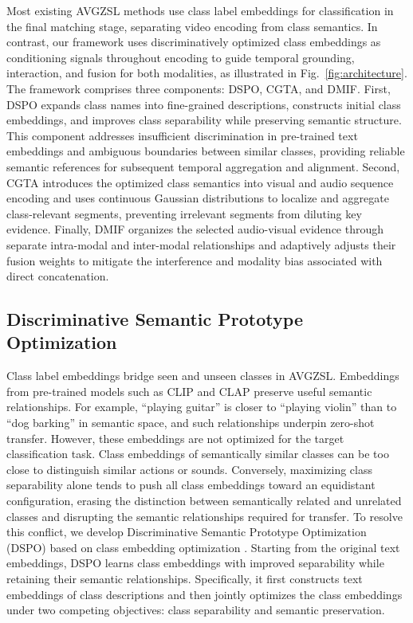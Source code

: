 Most existing AVGZSL methods use class label embeddings for classification in the final matching stage, separating video encoding from class semantics. In contrast, our framework uses discriminatively optimized class embeddings as conditioning signals throughout encoding to guide temporal grounding, interaction, and fusion for both modalities, as illustrated in Fig.~\ref{fig:architecture}. The framework comprises three components: DSPO, CGTA, and DMIF. First, DSPO expands class names into fine-grained descriptions, constructs initial class embeddings, and improves class separability while preserving semantic structure. This component addresses insufficient discrimination in pre-trained text embeddings and ambiguous boundaries between similar classes, providing reliable semantic references for subsequent temporal aggregation and alignment. Second, CGTA introduces the optimized class semantics into visual and audio sequence encoding and uses continuous Gaussian distributions to localize and aggregate class-relevant segments, preventing irrelevant segments from diluting key evidence. Finally, DMIF organizes the selected audio-visual evidence through separate intra-modal and inter-modal relationships and adaptively adjusts their fusion weights to mitigate the interference and modality bias associated with direct concatenation.



\subsection{Discriminative Semantic Prototype Optimization}\label{sec:discriminative-semantic-prototype-optimization}

Class label embeddings bridge seen and unseen classes in AVGZSL. Embeddings from pre-trained models such as CLIP and CLAP preserve useful semantic relationships. For example, \textquotedblleft{}playing guitar\textquotedblright{} is closer to \textquotedblleft{}playing violin\textquotedblright{} than to \textquotedblleft{}dog barking\textquotedblright{} in semantic space, and such relationships underpin zero-shot transfer. However, these embeddings are not optimized for the target classification task. Class embeddings of semantically similar classes can be too close to distinguish similar actions or sounds. Conversely, maximizing class separability alone tends to push all class embeddings toward an equidistant configuration, erasing the distinction between semantically related and unrelated classes and disrupting the semantic relationships required for transfer. To resolve this conflict, we develop Discriminative Semantic Prototype Optimization (DSPO) based on class embedding optimization \cite{mo2024easy}. Starting from the original text embeddings, DSPO learns class embeddings with improved separability while retaining their semantic relationships. Specifically, it first constructs text embeddings of class descriptions and then jointly optimizes the class embeddings under two competing objectives: class separability and semantic preservation.

